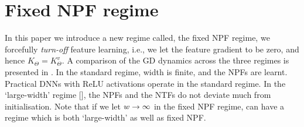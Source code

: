 \section{Fixed NPF regime}

In this paper we introduce a new regime called, the fixed NPF regime, we forcefully \emph{turn-off} feature learning, i.e., we let the feature gradient to be zero, and hence $K_{\Theta}=K^v_{\Theta}$. 
A comparison of the GD dynamics across the three regimes is presented in . In the standard regime, width is finite, and the NPFs are learnt. Practical DNNs with ReLU activations operate in the standard regime. In the `large-width' regime [], the NPFs and the NTFs do not deviate much from initialisation. Note that if we let $w\rightarrow\infty$ in the fixed NPF regime, can have a regime which is both `large-width' as well as fixed NPF.
\FloatBarrier
\begin{table}[h]\centering
{}
\caption{Dynamics in various regimes. Here $p\in[P], s\in[n]$.}
\label{tb:dynamics}
\end{table}

